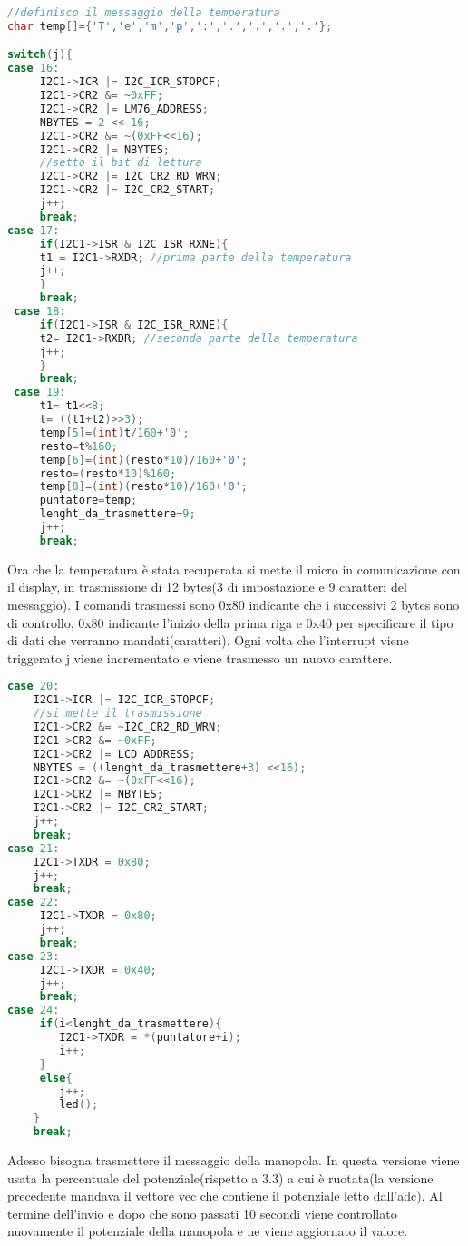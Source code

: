 \documentclass[main.tex]{subfiles}
\begin{document}
\begin{lstlisting}[language=C,caption=Lettura temperatura]
//definisco il messaggio della temperatura
char temp[]={'T','e','m','p',':','.','.','.','.'};

switch(j){
case 16:
     I2C1->ICR |= I2C_ICR_STOPCF; 
     I2C1->CR2 &= ~0xFF; 
     I2C1->CR2 |= LM76_ADDRESS; 
     NBYTES = 2 << 16; 
     I2C1->CR2 &= ~(0xFF<<16); 
     I2C1->CR2 |= NBYTES; 
     //setto il bit di lettura
     I2C1->CR2 |= I2C_CR2_RD_WRN;
     I2C1->CR2 |= I2C_CR2_START; 
     j++;
     break;
case 17:
     if(I2C1->ISR & I2C_ISR_RXNE){ 
     t1 = I2C1->RXDR; //prima parte della temperatura
     j++;
     }
     break;
 case 18:
     if(I2C1->ISR & I2C_ISR_RXNE){
     t2= I2C1->RXDR; //seconda parte della temperatura
     j++;
     }
     break;
 case 19:
     t1= t1<<8; 
     t= ((t1+t2)>>3); 
     temp[5]=(int)t/160+'0';
     resto=t%160;
     temp[6]=(int)(resto*10)/160+'0';
     resto=(resto*10)%160;
     temp[8]=(int)(resto*10)/160+'0';
     puntatore=temp;
     lenght_da_trasmettere=9;
     j++;
     break; 
\end{lstlisting}
Ora che la temperatura è stata recuperata si mette il micro in comunicazione con il display, in trasmissione di 12 bytes(3 di impostazione e 9 caratteri del messaggio). 
I comandi trasmessi sono 0x80 indicante che i successivi 2 bytes sono di controllo, 0x80 indicante l'inizio della prima riga e 0x40 per specificare il tipo di dati che verranno mandati(caratteri). Ogni volta che l'interrupt viene triggerato j viene incrementato e viene trasmesso un nuovo carattere.
\begin{lstlisting}[language=C,caption=Trasmissione messaggio display]
case 20:
	I2C1->ICR |= I2C_ICR_STOPCF;
	//si mette il trasmissione
	I2C1->CR2 &= ~I2C_CR2_RD_WRN; 
	I2C1->CR2 &= ~0xFF; 
	I2C1->CR2 |= LCD_ADDRESS;
	NBYTES = ((lenght_da_trasmettere+3) <<16); 
	I2C1->CR2 &= ~(0xFF<<16); 
	I2C1->CR2 |= NBYTES; 
	I2C1->CR2 |= I2C_CR2_START; 
	j++;
	break; 
case 21:
	I2C1->TXDR = 0x80; 
	j++;
	break;
case 22:
	 I2C1->TXDR = 0x80;
	 j++;
	 break;
case 23:
	 I2C1->TXDR = 0x40;
	 j++;
	 break;
case 24:
	 if(i<lenght_da_trasmettere){
		I2C1->TXDR = *(puntatore+i);
		i++;
	 }
	 else{
		j++;
        led();
	}
	break;
\end{lstlisting}
Adesso bisogna trasmettere il messaggio della manopola. In questa versione viene usata la percentuale del potenziale(rispetto a 3.3) a cui è ruotata(la versione precedente mandava il vettore vec che contiene il potenziale letto dall'adc). Al termine dell'invio e dopo che sono passati 10 secondi viene controllato nuovamente il potenziale della manopola e ne viene aggiornato il valore.
\end{document}

